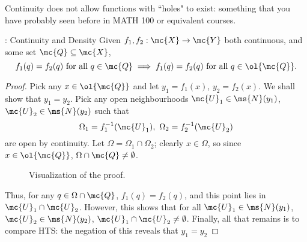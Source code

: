 \begin{note}
	Continuity does not allow functions with ``holes" to exist: something that you have probably seen before in MATH 100 or equivalent courses.
\end{note}
\begin{nproposition}{: Continuity and Density}
	Given \(f_1,f_2:\mc{X}\to\mc{Y}\) both continuous, and some set \(\mc{Q}\subseteq\mc{X}\),
	\begin{equation*}
		f_1(q)=f_2(q)~\text{for all}~q\in\mc{Q}\implies f_1(q)=f_2(q)~\text{for all}~q\in\ol{\mc{Q}}.
	\end{equation*}
\end{nproposition}
\begin{proof}
	Pick any \(x\in\ol{\mc{Q}}\) and let \(y_1=f_1(x)\), \(y_2=f_2(x)\). We shall show that \(y_1=y_2\). Pick any open neighbourhoods \(\mc{U}_1\in\ms{N}(y_1)\), \(\mc{U}_2\in\ms{N}(y_2)\) such that 
	\begin{equation*}
		\Omega_1=f^{-1}_1(\mc{U}_1),~\Omega_2=f^{-1}_2(\mc{U}_2)
	\end{equation*}
	are open by continuity. Let \(\Omega=\Omega_1\cap\Omega_2\); clearly \(x\in\Omega\), so since \(x\in\ol{\mc{Q}}\), \(\Omega\cap\mc{Q}\neq\emptyset\).
	\begin{figure}[htbp]
		\centering
		\caption{Visualization of the proof.}
	\end{figure}
	Thus, for any \(q\in\Omega\cap\mc{Q}\), \(f_1(q)=f_2(q)\), and this point lies in \(\mc{U}_1\cap\mc{U}_2\). However, this shows that for all \(\mc{U}_1\in\ms{N}(y_1)\), \(\mc{U}_2\in\ms{N}(y_2)\), \(\mc{U}_1\cap\mc{U}_2\neq\emptyset\). Finally, all that remains is to compare HTS: the negation of this reveals that \(y_1=y_2\)
\end{proof}
